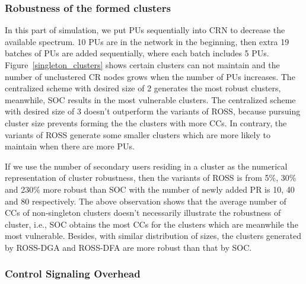\documentclass[times]{ettauth}
\newcommand{\ie}{i.e., }
\theoremstyle{mytheoremstyle}
\theoremstyle{mytheoremstyle}
\theoremstyle{mytheoremstyle}
\begin{document}
\subsubsection{Robustness of the formed clusters}
In this part of simulation, we put PUs sequentially into CRN to decrease the available spectrum.
10 PUs are in the network in the beginning, then extra 19 batches of PUs are added sequentially, where each batch includes 5 PUs. 
%
Figure~\ref{singleton_clusters} shows certain clusters can not maintain and the number of unclustered CR nodes grows when the number of PUs increases.
The centralized scheme with desired size of 2 generates the most robust clusters, meanwhile, SOC results in the most vulnerable clusters.
The centralized scheme with desired size of 3 doesn't outperform the variants of ROSS, because pursuing cluster size prevents forming the the clusters with more CCs.
In contrary, the variants of ROSS generate some smaller clusters which are more likely to maintain when there are more PUs.

If we use the number of secondary users residing in a cluster as the numerical representation of cluster robustness, then the variants of ROSS is from 5\%,  30\% and 230\% more robust than SOC with the number of newly added PR is 10, 40 and 80 respectively.
The above observation shows that the average number of CCs of non-singleton clusters doesn't necessarily illustrate the robustness  of cluster, \ie SOC obtains the most CCs for the clusters which are meanwhile the most vulnerable.
Besides, with similar distribution of sizes, the clusters generated by ROSS-DGA and ROSS-DFA are more robust than that by SOC.


\subsubsection{Control Signaling Overhead}
\end{document}
